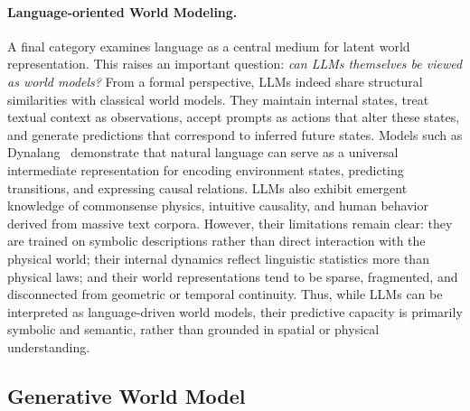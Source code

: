 \paragraph{Language-oriented World Modeling.}
A final category examines language as a central medium for latent world representation.
This raises an important question: \emph{can LLMs themselves be viewed as world models?}
From a formal perspective, LLMs indeed share structural similarities with classical world models.
They maintain internal states, treat textual context as observations, accept prompts as actions that alter these states, and generate predictions that correspond to inferred future states.
Models such as Dynalang~\cite{lin2023learning} demonstrate that natural language can serve as a universal intermediate representation for encoding environment states, predicting transitions, and expressing causal relations.
LLMs also exhibit emergent knowledge of commonsense physics, intuitive causality, and human behavior derived from massive text corpora.
However, their limitations remain clear: they are trained on symbolic descriptions rather than direct interaction with the physical world; their internal dynamics reflect linguistic statistics more than physical laws; and their world representations tend to be sparse, fragmented, and disconnected from geometric or temporal continuity.
Thus, while LLMs can be interpreted as language-driven world models, their predictive capacity is primarily symbolic and semantic, rather than grounded in spatial or physical understanding.







\subsection{Generative World Model}
\label{subsec:p3_s8_6_gen}

